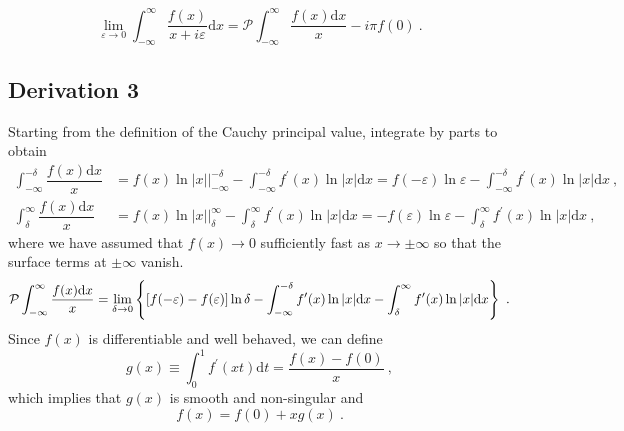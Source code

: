 \documentclass[11pt,a4paper]{article}
\newcommand{\dif}{\mathrm{d}}
\begin{document}
\begin{equation}
\lim_{\varepsilon \rightarrow 0} \int_{-\infty}^{\infty} \dfrac{f(x)}{x+i\varepsilon} \dif x = {\mathcal P} \int_{-\infty}^\infty \dfrac{f(x) \dif x}{x} - i \pi f(0) ~.
\end{equation}

\subsection{Derivation 3}
Starting from the definition of the Cauchy principal value, integrate by parts to obtain
\begin{align*}
\int_{-\infty}^{-\delta} \dfrac{f(x) \dif x}{x} &= f(x) \ln |x| \Big|_{-\infty}^{-\delta} - \int_{-\infty}^{-\delta} f^\prime(x) \ln|x| \dif x = f(-\varepsilon) \ln \varepsilon - \int_{-\infty}^{-\delta} f^\prime(x) \ln|x| \dif x ~, \\
\int_{\delta}^\infty \dfrac{f(x) \dif x}{x} &= f(x) \ln |x| \Big|_{\delta}^\infty - \int_{\delta}^\infty f^\prime(x) \ln|x| \dif x = -f(\varepsilon) \ln \varepsilon - \int_{\delta}^\infty f^\prime(x) \ln|x| \dif x ~,
\end{align*}
where we have assumed that $f(x) \rightarrow 0$ sufficiently fast as $x \rightarrow \pm \infty$ so that the surface terms at $\pm \infty$ vanish.
\begin{equation}
{\cal P} \int_{-\infty}^\infty \dfrac{f(x) \dif x}{x} = \lim_{\delta \rightarrow 0} \left\{[f(-\varepsilon) -f(\varepsilon)] \ln \delta - \int_{-\infty}^{-\delta} f^\prime(x) \ln|x| \dif x - \int_{\delta}^\infty f^\prime(x) \ln|x| \dif x \right\} ~.
\end{equation}
Since $f(x)$ is differentiable and well behaved, we can define
\begin{equation}
g(x) \equiv \int_0^1 f^\prime(xt) \dif t = \dfrac{f(x) -f(0)}{x} ~,
\end{equation}
which implies that $g(x)$ is smooth and non-singular and
\begin{equation}
f(x) = f(0) +xg(x) ~.
\end{equation}
\end{document}

